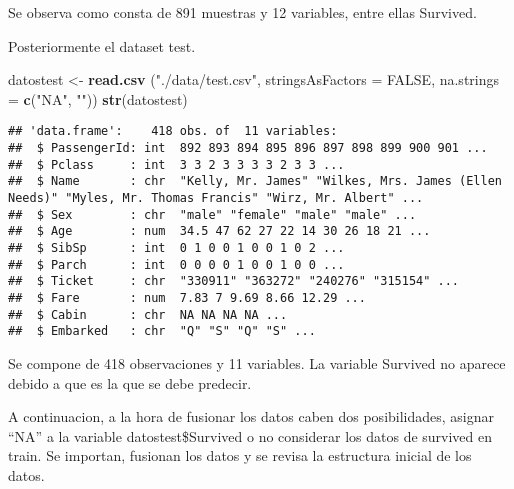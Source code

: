 \documentclass[]{article}
\newenvironment{Shaded}{\begin{snugshade}}{\end{snugshade}}
\newcommand{\KeywordTok}[1]{\textcolor[rgb]{0.13,0.29,0.53}{\textbf{#1}}}
\newcommand{\DataTypeTok}[1]{\textcolor[rgb]{0.13,0.29,0.53}{#1}}
\newcommand{\StringTok}[1]{\textcolor[rgb]{0.31,0.60,0.02}{#1}}
\newcommand{\OtherTok}[1]{\textcolor[rgb]{0.56,0.35,0.01}{#1}}
\newcommand{\OperatorTok}[1]{\textcolor[rgb]{0.81,0.36,0.00}{\textbf{#1}}}
\newcommand{\NormalTok}[1]{#1}
\begin{document}
Se observa como consta de 891 muestras y 12 variables, entre ellas
Survived.

Posteriormente el dataset test.

\begin{Shaded}
\begin{Highlighting}[]
\NormalTok{datostest <-}\StringTok{ }\KeywordTok{read.csv}\NormalTok{ (}\StringTok{"./data/test.csv"}\NormalTok{, }\DataTypeTok{stringsAsFactors =} \OtherTok{FALSE}\NormalTok{, }\DataTypeTok{na.strings =} \KeywordTok{c}\NormalTok{(}\StringTok{"NA"}\NormalTok{, }\StringTok{""}\NormalTok{))}
\KeywordTok{str}\NormalTok{(datostest)}
\end{Highlighting}
\end{Shaded}

\begin{verbatim}
## 'data.frame':    418 obs. of  11 variables:
##  $ PassengerId: int  892 893 894 895 896 897 898 899 900 901 ...
##  $ Pclass     : int  3 3 2 3 3 3 3 2 3 3 ...
##  $ Name       : chr  "Kelly, Mr. James" "Wilkes, Mrs. James (Ellen Needs)" "Myles, Mr. Thomas Francis" "Wirz, Mr. Albert" ...
##  $ Sex        : chr  "male" "female" "male" "male" ...
##  $ Age        : num  34.5 47 62 27 22 14 30 26 18 21 ...
##  $ SibSp      : int  0 1 0 0 1 0 0 1 0 2 ...
##  $ Parch      : int  0 0 0 0 1 0 0 1 0 0 ...
##  $ Ticket     : chr  "330911" "363272" "240276" "315154" ...
##  $ Fare       : num  7.83 7 9.69 8.66 12.29 ...
##  $ Cabin      : chr  NA NA NA NA ...
##  $ Embarked   : chr  "Q" "S" "Q" "S" ...
\end{verbatim}

Se compone de 418 observaciones y 11 variables. La variable Survived no
aparece debido a que es la que se debe predecir.

A continuacion, a la hora de fusionar los datos caben dos posibilidades,
asignar ``NA'' a la variable datostest\$Survived o no considerar los
datos de survived en train. Se importan, fusionan los datos y se revisa
la estructura inicial de los datos.

\begin{Shaded}
\end{Shaded}
\end{document}
